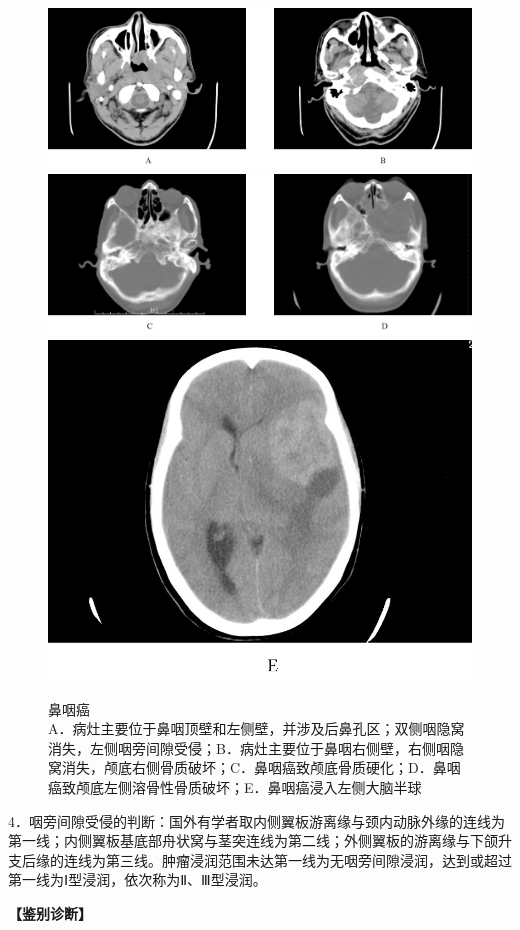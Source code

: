 \begin{figure}[!htbp]
 \centering
\includegraphics[width=.7\textwidth,height=\textheight,keepaspectratio]{./images/Image00146.jpg}
\includegraphics[width=.7\textwidth,height=\textheight,keepaspectratio]{./images/Image00147.jpg}
\includegraphics[width=.7\textwidth,height=\textheight,keepaspectratio]{./images/Image00148.jpg}
 \captionsetup{justification=centering}
 \caption{鼻咽癌\\{\small A．病灶主要位于鼻咽顶壁和左侧壁，并涉及后鼻孔区；双侧咽隐窝消失，左侧咽旁间隙受侵；B．病灶主要位于鼻咽右侧壁，右侧咽隐窝消失，颅底右侧骨质破坏；C．鼻咽癌致颅底骨质硬化；D．鼻咽癌致颅底左侧溶骨性骨质破坏；E．鼻咽癌浸入左侧大脑半球}}
 \label{fig6-7}
  \end{figure} 

4．咽旁间隙受侵的判断：国外有学者取内侧翼板游离缘与颈内动脉外缘的连线为第一线；内侧翼板基底部舟状窝与茎突连线为第二线；外侧翼板的游离缘与下颌升支后缘的连线为第三线。肿瘤浸润范围未达第一线为无咽旁间隙浸润，达到或超过第一线为Ⅰ型浸润，依次称为Ⅱ、Ⅲ型浸润。

\textbf{【鉴别诊断】}

